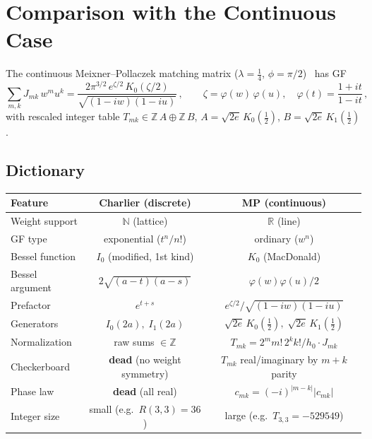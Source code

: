 \documentclass[11pt,a4paper]{article}
\newcommand{\R}{\mathbb{R}}
\newcommand{\Z}{\mathbb{Z}}
\newcommand{\N}{\mathbb{N}}
\begin{document}
\section{Comparison with the Continuous Case}

The continuous Meixner--Pollaczek matching matrix
($\lambda = \tfrac14$, $\phi = \pi/2$)~\cite{mp} has GF
\[
  \sum_{m,k} J_{mk}\, w^m u^k
  = \frac{2\pi^{3/2}\, e^{\zeta/2}\, K_0(\zeta/2)}
         {\sqrt{(1-iw)(1-iu)}}\,,
  \qquad \zeta = \varphi(w)\,\varphi(u), \quad
  \varphi(t) = \frac{1+it}{1-it}\,,
\]
with rescaled integer table
$T_{mk} \in \Z\, A \oplus \Z\, B$,
$A = \sqrt{2e}\, K_0(\tfrac12)$, $B = \sqrt{2e}\, K_1(\tfrac12)$.

\subsection*{Dictionary}

\begin{center}
\begin{tabular}{lcc}
\toprule
Feature & Charlier (discrete) & MP (continuous) \\
\midrule
Weight support & $\N$ (lattice) & $\R$ (line) \\
GF type & exponential ($t^n/n!$) & ordinary ($w^n$) \\
Bessel function & $I_0$ (modified, 1st kind) & $K_0$ (MacDonald) \\
Bessel argument & $2\sqrt{(a-t)(a-s)}$ & $\varphi(w)\varphi(u)/2$ \\
Prefactor & $e^{t+s}$ & $e^{\zeta/2}/\sqrt{(1-iw)(1-iu)}$ \\
Generators & $I_0(2a),\; I_1(2a)$ & $\sqrt{2e}\, K_0(\tfrac12),\; \sqrt{2e}\, K_1(\tfrac12)$ \\
Normalization & raw sums $\in \Z$ & $T_{mk} = 2^m m!\, 2^k k! / h_0 \cdot J_{mk}$ \\
Checkerboard & \textbf{dead} (no weight symmetry) & $T_{mk}$ real/imaginary by $m+k$ parity \\
Phase law & \textbf{dead} (all real) & $c_{mk} = (-i)^{|m-k|}|c_{mk}|$ \\
Integer size & small (e.g.\ $R(3,3) = 36$) & large (e.g.\ $T_{3,3} = -529549$) \\
\bottomrule
\end{tabular}
\end{center}
\end{document}
